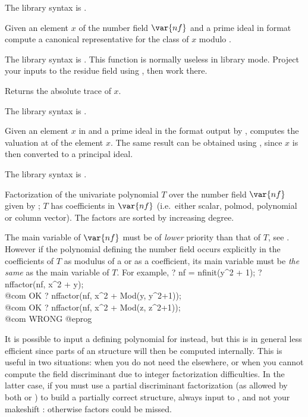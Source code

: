 The library syntax is .

\label{se:nfeltreducemodpr}
Given an element $x$ of the number field $\var{nf}$ and a prime ideal
 in  format compute a canonical representative for the
class of $x$ modulo .

The library syntax is .
This function is normally useless in library mode. Project your
inputs to the residue field using , then work there.

\label{se:nfelttrace}
Returns the absolute trace of $x$.

The library syntax is .

\label{se:nfeltval}
Given an element $x$ in
 and a prime ideal  in the format output by
, computes the valuation at  of the
element $x$. The same result can be obtained using
, since $x$ is then converted to a
principal ideal.

The library syntax is .

\label{se:nffactor}
Factorization of the univariate
polynomial $T$ over the number field $\var{nf}$ given by ; $T$
has coefficients in $\var{nf}$ (i.e.~either scalar, polmod, polynomial or
column vector). The factors are sorted by increasing degree.

The main variable of $\var{nf}$ must be of \emph{lower}
priority than that of $T$, see . However if
the polynomial defining the number field occurs explicitly  in the
coefficients of $T$ as modulus of a  or as a 
coefficient, its main variable must be \emph{the same} as the main variable
of $T$. For example,
\bprog
? nf = nfinit(y^2 + 1);
? nffactor(nf, x^2 + y); \\@com OK
? nffactor(nf, x^2 + Mod(y, y^2+1)); \\ @com OK
? nffactor(nf, x^2 + Mod(z, z^2+1)); \\ @com WRONG
@eprog

It is possible to input a defining polynomial for 
instead, but this is in general less efficient since parts of an 
structure will then be computed internally. This is useful in two
situations: when you do not need the  elsewhere, or when you cannot
compute the field discriminant due to integer factorization difficulties. In
the latter case, if you must use a partial discriminant factorization (as
allowed by both  or ) to build a partially correct
 structure, always input  to , and not your
makeshift : otherwise factors could be missed.


